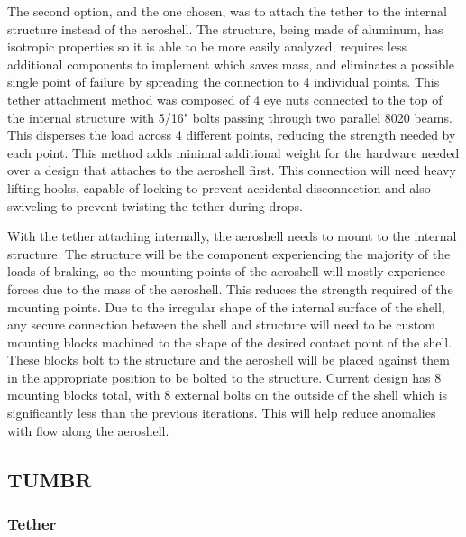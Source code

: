 The second option, and the one chosen, was to attach the tether to the internal structure instead of the aeroshell. The structure, being made of aluminum, has isotropic properties so it is able to be more easily analyzed, requires less additional components to implement which saves mass, and eliminates a possible single point of failure by spreading the connection to 4 individual points. This tether attachment method was composed of 4 eye nuts connected to the top of the internal structure with 5/16" bolts passing through two parallel 8020 beams. This disperses the load across 4 different points, reducing the strength needed by each point. This method adds minimal additional weight for the hardware needed over a design that attaches to the aeroshell first. This connection will need heavy lifting hooks, capable of locking to prevent accidental disconnection and also swiveling to prevent twisting the tether during drops.

With the tether attaching internally, the aeroshell needs to mount to the internal structure. The structure will be the component experiencing the majority of the loads of braking, so the mounting points of the aeroshell will mostly experience forces due to the mass of the aeroshell. This reduces the strength required of the mounting points. Due to the irregular shape of the internal surface of the shell, any secure connection between the shell and structure will need to be custom mounting blocks machined to the shape of the desired contact point of the shell. These blocks bolt to the structure and the aeroshell will be placed against them in the appropriate position to be bolted to the structure. Current design has 8 mounting blocks total, with 8 external bolts on the outside of the shell which is significantly less than the previous iterations. This will help reduce anomalies with flow along the aeroshell.

\subsection{TUMBR}

\subsubsection{Tether}

